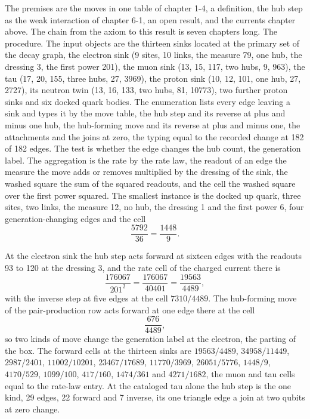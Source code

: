 \begin{chproof}
The premises are the moves in one table of chapter 1-4, a definition, the hub step as the weak interaction of chapter 6-1, an open result, and the currents chapter above. The chain from the axiom to this result is seven chapters long. The procedure. The input objects are the thirteen sinks located at the primary set of the decay graph, the electron sink (9 sites, 10 links, the measure 79, one hub, the dressing 3, the first power 201), the muon sink (13, 15, 117, two hubs, 9, 963), the tau (17, 20, 155, three hubs, 27, 3969), the proton sink (10, 12, 101, one hub, 27, 2727), its neutron twin (13, 16, 133, two hubs, 81, 10773), two further proton sinks and six docked quark bodies. The enumeration lists every edge leaving a sink and types it by the move table, the hub step and its reverse at plus and minus one hub, the hub-forming move and its reverse at plus and minus one, the attachments and the joins at zero, the typing equal to the recorded change at 182 of 182 edges. The test is whether the edge changes the hub count, the generation label. The aggregation is the rate by the rate law, the readout of an edge the measure the move adds or removes multiplied by the dressing of the sink, the washed square the sum of the squared readouts, and the cell the washed square over the first power squared. The smallest instance is the docked up quark, three sites, two links, the measure 12, no hub, the dressing 1 and the first power 6, four generation-changing edges and the cell
\begin{equation}
\frac{5792}{36} = \frac{1448}{9} .
\end{equation}

At the electron sink the hub step acts forward at sixteen edges with the readouts 93 to 120 at the dressing 3, and the rate cell of the charged current there is
\begin{equation}
\frac{176067}{201^{2}} = \frac{176067}{40401} = \frac{19563}{4489} ,
\end{equation}
with the inverse step at five edges at the cell $7310/4489$. The hub-forming move of the pair-production row acts forward at one edge there at the cell
\begin{equation}
\frac{676}{4489} ,
\end{equation}
so two kinds of move change the generation label at the electron, the parting of the box. The forward cells at the thirteen sinks are $19563/4489$, $34958/11449$, $2987/2401$, $11002/10201$, $23467/17689$, $11770/3969$, $26051/5776$, $1448/9$, $4170/529$, $1099/100$, $417/160$, $1474/361$ and $4271/1682$, the muon and tau cells equal to the rate-law entry. At the cataloged tau alone the hub step is the one kind, 29 edges, 22 forward and 7 inverse, its one triangle edge a join at two qubits at zero change.


\end{chproof}
